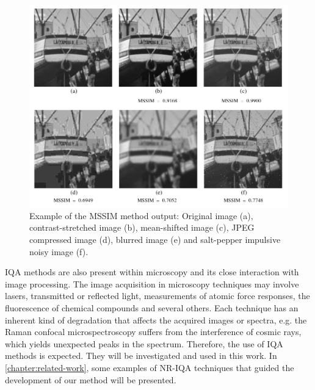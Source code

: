 \begin{figure}[ht]
	\centering
	\caption{\label{fig:mssim_IQA_exampe} Example of the MSSIM method output: Original image (a), contrast-stretched image (b), mean-shifted image (c), JPEG compressed image (d), blurred image (e) and salt-pepper impulsive noisy image (f).}
	\begin{center}
    \includegraphics[scale=0.4]{images/mssim_IQA.png}
	\end{center}
	\centering
\end{figure}

IQA methods are also present within microscopy and its close interaction with image processing. The image acquisition in microscopy techniques may involve lasers, transmitted or reflected light, measurements of atomic force responses, the fluorescence of chemical compounds and several others. Each technique has an inherent kind of degradation that affects the acquired images or spectra, e.g. the Raman confocal microspectroscopy suffers from the interference of cosmic rays, which yields unexpected peaks in the spectrum. Therefore, the use of IQA methods is expected. They will be investigated and used in this work. In \autoref{chapter:related-work}, some examples of NR-IQA techniques that guided the development of our method will be presented.